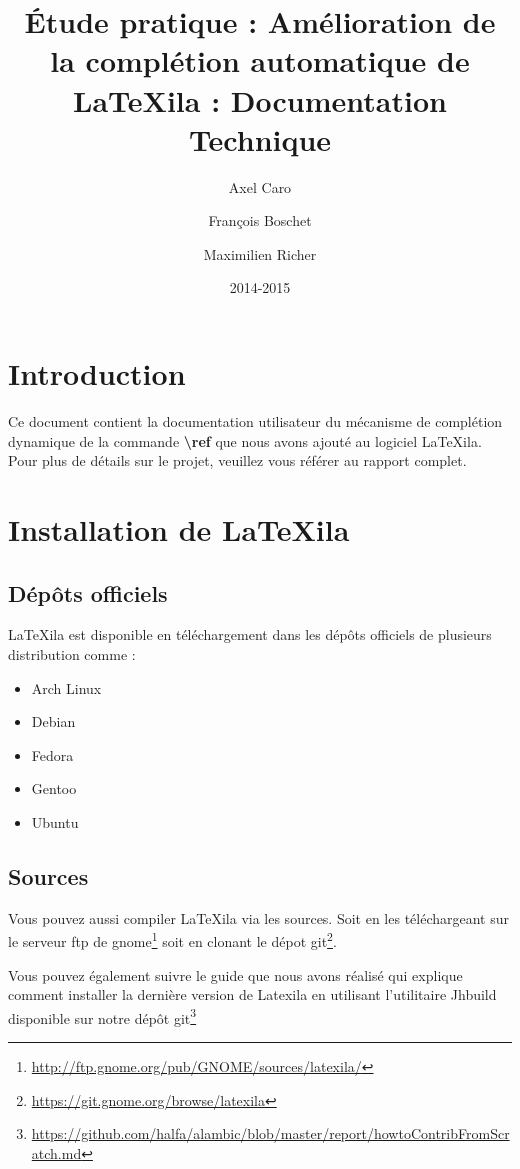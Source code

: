 \documentclass[a4paper,11pt]{report}
\title{Étude pratique : Amélioration de la complétion automatique de \LaTeX{}ila  : Documentation Technique}
\author{Axel Caro\and François Boschet\and Maximilien Richer}
\date{2014-2015}
\begin{document}


\maketitle %

\chapter{Introduction}
\label{cha:Introduction}
Ce document contient la documentation utilisateur du mécanisme de complétion dynamique de la commande \textbf{\textbackslash{}ref} que nous avons ajouté au logiciel \LaTeX{}ila.
Pour plus de détails sur le projet, veuillez vous référer au rapport complet.

\chapter{Installation de \LaTeX{}ila}
\label{cha:Installation}

\section{Dépôts officiels}
\label{sec:depots}

\LaTeX{}ila est disponible en téléchargement dans les dépôts officiels de plusieurs distribution comme :
\begin{itemize}
\item Arch Linux
\item Debian
\item Fedora
\item Gentoo
\item Ubuntu
\end{itemize}

\section{Sources}
\label{sec:sources}

Vous pouvez aussi compiler \LaTeX{}ila via les sources. Soit en les téléchargeant sur le serveur ftp de gnome\footnote{\url{http://ftp.gnome.org/pub/GNOME/sources/latexila/}} soit en clonant le dépot git\footnote{\url{https://git.gnome.org/browse/latexila}}.

Vous pouvez également suivre le guide que nous avons réalisé qui explique comment installer la dernière version de Latexila en utilisant l'utilitaire Jhbuild disponible sur notre dépôt git\footnote{\url{https://github.com/halfa/alambic/blob/master/report/howtoContribFromScratch.md}}
\end{document}
